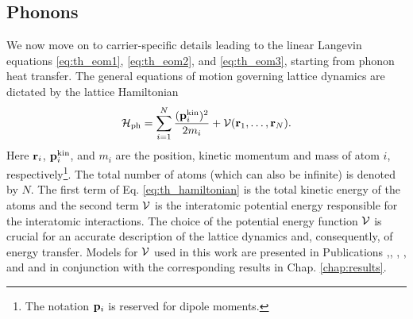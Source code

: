 \subsection{Phonons}

\label{sec:th_eom2_phonon}


We now move on to carrier-specific details leading to the linear Langevin equations \eqref{eq:th_eom1}, \eqref{eq:th_eom2}, and \eqref{eq:th_eom3}, starting from phonon heat transfer. The general equations of motion governing lattice dynamics are dictated by the lattice Hamiltonian \cite{ziman}
\begin{equation}
 \mathcal{H}_{\textrm{ph}} = \sum_{i=1}^N \frac{(\mathbf{p}^{\textrm{kin}}_i)^2}{2m_i} + \mathcal{V}(\mathbf{r}_1,\dots,\mathbf{r}_N). \label{eq:th_hamiltonian}
\end{equation}
Here $\mathbf{r}_i$, $\mathbf{p}^{\textrm{kin}}_i$, and $m_i$ are the position, kinetic momentum and mass of atom $i$, respectively\footnote{The notation $\mathbf{p}_i$ is reserved for dipole moments.}. The total number of atoms (which can also be infinite) is denoted by $N$. The first term of Eq. \eqref{eq:th_hamiltonian} is the total kinetic energy of the atoms and the second term $\mathcal{V}$ is the interatomic potential energy responsible for the interatomic interactions. The choice of the potential energy function $\mathcal{V}$ is crucial for an accurate description of the lattice dynamics and, consequently, of energy transfer. Models for $\mathcal{V}$ used in this work are presented in Publications ,, , , and  and in conjunction with the corresponding results in Chap. \ref{chap:results}.


